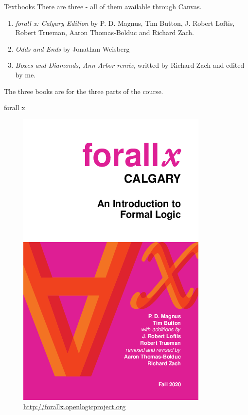 \documentclass[
  ignorenonframetext,
]{beamer}
\providecommand{\tightlist}{%
  \setlength{\itemsep}{0pt}\setlength{\parskip}{0pt}}
\renewcommand{\,}{\text{, }}
\begin{document}
\begin{frame}{Textbooks}
\protect\hypertarget{textbooks}{}
There are three - all of them available through Canvas.

\begin{enumerate}
\tightlist
\item
  \emph{forall x: Calgary Edition} by P. D. Magnus, Tim Button, J.
  Robert Loftis, Robert Trueman, Aaron Thomas-Bolduc and Richard Zach.
\item
  \emph{Odds and Ends} by Jonathan Weisberg
\item
  \emph{Boxes and Diamonds, Ann Arbor remix}, writted by Richard Zach
  and edited by me.
\end{enumerate}

The three books are for the three parts of the course.
\end{frame}

\begin{frame}{forall x}
\protect\hypertarget{forall-x}{}
\begin{figure}
\centering
\includegraphics[width=\textwidth,height=0.8\textheight]{../images/forallxyyc.png}
\caption{\url{http://forallx.openlogicproject.org}}
\end{figure}
\end{frame}
\end{document}
